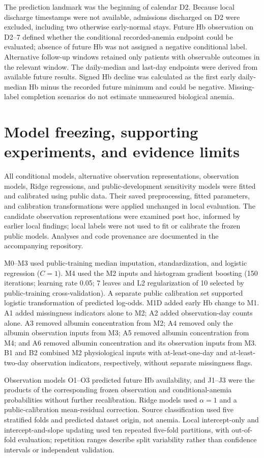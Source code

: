 \documentclass[pdflatex,sn-vancouver-num]{sn-jnl}
\begin{document}
The prediction landmark was the beginning of calendar D2. Because local discharge timestamps were not available, admissions discharged on D2 were excluded, including two otherwise early-normal stays. Future Hb observation on D2--7 defined whether the conditional recorded-anemia endpoint could be evaluated; absence of future Hb was not assigned a negative conditional label. Alternative follow-up windows retained only patients with observable outcomes in the relevant window. The daily-median and last-day endpoints were derived from available future results. Signed Hb decline was calculated as the first early daily-median Hb minus the recorded future minimum and could be negative. Missing-label completion scenarios do not estimate unmeasured biological anemia.

\section{Model freezing, supporting experiments, and evidence limits}

All conditional models, alternative observation representations, observation models, Ridge regressions, and public-development sensitivity models were fitted and calibrated using public data. Their saved preprocessing, fitted parameters, and calibration transformations were applied unchanged in local evaluation. The candidate observation representations were examined post hoc, informed by earlier local findings; local labels were not used to fit or calibrate the frozen public models. Analyses and code provenance are documented in the accompanying repository.

M0--M3 used public-training median imputation, standardization, and logistic regression ($C=1$). M4 used the M2 inputs and histogram gradient boosting (150 iterations; learning rate 0.05; 7 leaves and L2 regularization of 10 selected by public-training cross-validation). A separate public calibration set supported logistic transformation of predicted log-odds. M1D added early Hb change to M1. A1 added missingness indicators alone to M2; A2 added observation-day counts alone. A3 removed albumin concentration from M2; A4 removed only the albumin observation inputs from M3; A5 removed albumin concentration from M4; and A6 removed albumin concentration and its observation inputs from M3. B1 and B2 combined M2 physiological inputs with at-least-one-day and at-least-two-day observation indicators, respectively, without separate missingness flags.

Observation models O1--O3 predicted future Hb availability, and J1--J3 were the products of the corresponding frozen observation and conditional-anemia probabilities without further recalibration. Ridge models used $\alpha=1$ and a public-calibration mean-residual correction. Source classification used five stratified folds and predicted dataset origin, not anemia. Local intercept-only and intercept-and-slope updating used ten repeated five-fold partitions, with out-of-fold evaluation; repetition ranges describe split variability rather than confidence intervals or independent validation.
\end{document}
